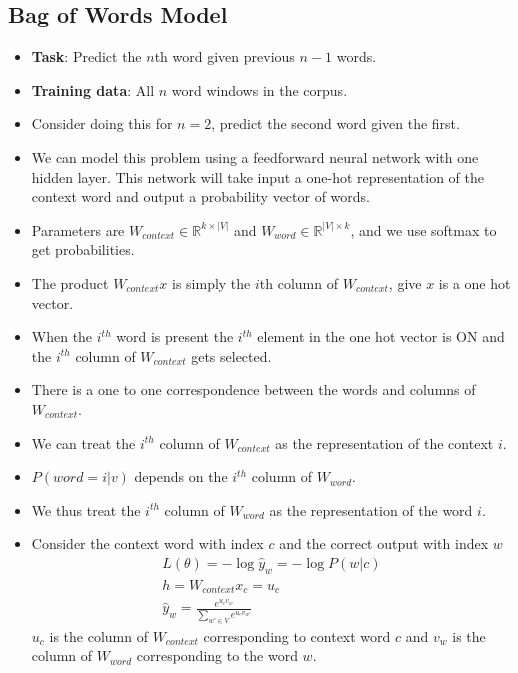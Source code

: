 \documentclass[a4paper]{article}
\begin{document}
\subsection{Bag of Words Model}
\begin{itemize}
    \item \textbf{Task}: Predict the $n$th word given previous $n-1$ words.
    \item \textbf{Training data}: All $n$ word windows in the corpus.
    \item Consider doing this for $n=2$, predict the second word given the first.
    \item We can model this problem using a feedforward neural network with one hidden layer. This network will take input a one-hot representation of the context word and output a probability vector of words.
    \item Parameters are $W_{context}\in \mathbb{R}^{k\times |V|}$ and $W_{word}\in \mathbb{R}^{|V|\times k}$, and we use softmax to get probabilities.
    \item The product $W_{context}x$ is simply the $i$th column of $W_{context}$, give $x$ is a one hot vector.
    \item When the $i^{th}$ word is present the $i^{th}$ element in the one hot vector is ON and the $i^{th}$ column of $W_{context}$ gets selected.
    \item There is a one to one correspondence between the words and columns of $W_{context}$.
    \item We can treat the $i^{th}$ column of $W_{context}$ as the representation of the context $i$.
    \item $P(word=i|v)$ depends on the $i^{th}$ column of $W_{word}$.
    \item We thus treat the $i^{th}$ column of $W_{word}$ as the representation of the word $i$.
    \item Consider the context word with index $c$ and the correct output with index $w$
    \begin{equation*}
        \begin{split}
            L(\theta)=-\log \hat{y}_w=-\log P(w|c)\\
            h=W_{context}x_c=u_c\\
            \hat{y}_w=\frac{e^{u_cv_w}}{\sum_{w'\in V}e^{u_cv_{w'}}}
        \end{split}
    \end{equation*}
    $u_c$ is the column of $W_{context}$ corresponding to context word $c$ and $v_w$ is the column of $W_{word}$ corresponding to the word $w$.

\end{itemize}
\end{document}
